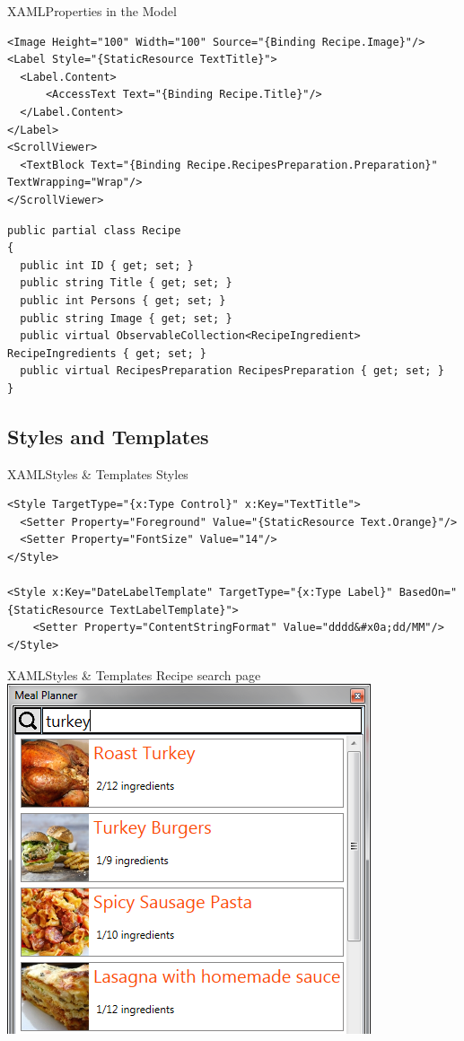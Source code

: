 \begin{frame}[fragile]{XAML}{Properties in the Model}

\begin{lstlisting}
<Image Height="100" Width="100" Source="{Binding Recipe.Image}"/>
<Label Style="{StaticResource TextTitle}">
  <Label.Content>
      <AccessText Text="{Binding Recipe.Title}"/>
  </Label.Content>
</Label>
<ScrollViewer>
  <TextBlock Text="{Binding Recipe.RecipesPreparation.Preparation}" TextWrapping="Wrap"/>
</ScrollViewer>
\end{lstlisting}

\begin{lstlisting}
public partial class Recipe
{
  public int ID { get; set; }
  public string Title { get; set; }
  public int Persons { get; set; }
  public string Image { get; set; }
  public virtual ObservableCollection<RecipeIngredient> RecipeIngredients { get; set; }
  public virtual RecipesPreparation RecipesPreparation { get; set; }
}
\end{lstlisting}

\end{frame}

\subsection{Styles and Templates} 
\begin{frame}[fragile]{XAML}{Styles \& Templates}
Styles
\begin{lstlisting}
<Style TargetType="{x:Type Control}" x:Key="TextTitle">
  <Setter Property="Foreground" Value="{StaticResource Text.Orange}"/>
  <Setter Property="FontSize" Value="14"/>
</Style>

<Style x:Key="DateLabelTemplate" TargetType="{x:Type Label}" BasedOn="{StaticResource TextLabelTemplate}">
    <Setter Property="ContentStringFormat" Value="dddd&#x0a;dd/MM"/>
</Style>
\end{lstlisting}

\end{frame}

\begin{frame}[fragile]{XAML}{Styles \& Templates}
  Recipe search page
  \includegraphics[width=.75\textwidth]{graphics/recipe-search-item.png}
\end{frame}

